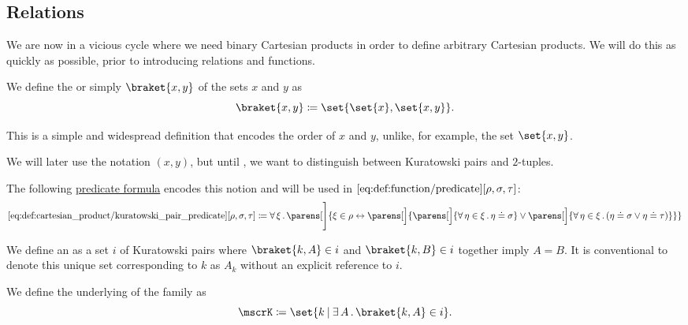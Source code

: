 \subsection{Relations}\label{subsec:relations}

\begin{definition}\label{def:cartesian_product}
  We are now in a vicious cycle where we need binary Cartesian products in order to define arbitrary Cartesian products. We will do this as quickly as possible, prior to introducing relations and functions.

  \begin{thmenum}
     We define the  or simply  \( \braket{ x, y } \) of the sets \( x \) and \( y \) as
    \begin{equation*}
      \braket{ x, y } \coloneqq \set{ \set{ x }, \set{ x, y } }.
    \end{equation*}

    This is a simple and widespread definition that encodes the order of \( x \) and \( y \), unlike, for example, the set \( \set{ x, y } \).

    We will later use the notation \( (x, y) \), but until , we want to distinguish between Kuratowski pairs and \( 2 \)-tuples.

    The following \hyperref[rem:predicate_formula]{predicate formula} encodes this notion and will be used in \( \ref{eq:def:function/predicate}[\rho, \sigma, \tau] \):
    \begin{equation*}\taglabel[\op{IsPair}]{eq:def:cartesian_product/kuratowski_pair_predicate}
      \ref{eq:def:cartesian_product/kuratowski_pair_predicate}[\rho, \sigma, \tau] \coloneqq \qforall \xi \parens[\Bigg]{ \xi \in \rho \leftrightarrow \parens[\Big]{ \parens[\Big]{ \qforall {\eta \in \xi} \eta \doteq \sigma } \vee \parens[\Big]{ \qforall {\eta \in \xi} (\eta \doteq \sigma \vee \eta \doteq \tau) } } }
    \end{equation*}

    \mimprovised We define an  as a set \( i \) of Kuratowski pairs where \( \braket{ k, A } \in i \) and \( \braket{ k, B } \in i \) together imply \( A = B \). It is conventional to denote this unique set corresponding to \( k \) as \( A_k \) without an explicit reference to \( i \).

    We define the underlying  of the family as
    \begin{equation*}
      \mscrK \coloneqq \set{ k \given \qexists A \braket{ k, A } \in i }.
    \end{equation*}


\end{thmenum}
\end{definition}
